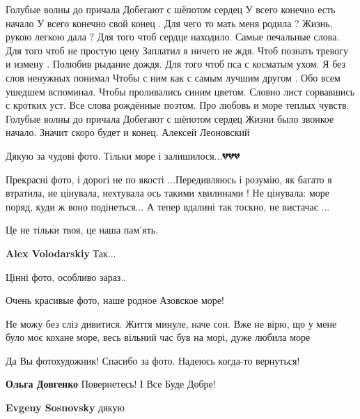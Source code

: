 \begin{multicols}{2}
\obeycr
Голубые волны до причала
Добегают с шёпотом сердец
У всего конечно есть начало
У всего конечно свой конец .
Для чего то мать меня родила ?
Жизнь, рукою легкою дала ?
Для того чтоб сердце находило.
Самые печальные слова.
Для того чтоб не простую цену
Заплатил я ничего не ждя.
Чтоб познать тревогу и измену .
Полюбив рыдание дождя.
Для того чтоб пса с косматым ухом.
Я без слов ненужных понимал
Чтобы с ним как с самым лучшим другом .
Обо всем ушедшем вспоминал.
Чтобы проливались синим цветом.
Словно лист сорвавшись с кротких уст.
Все слова рождённые поэтом.
Про любовь и море теплых чувств.
Голубые волны до причала
Добегают с шёпотом сердец
Жизни было звонкое начало.
Значит скоро будет и конец.
Алексей Леоновский
\restorecr


Дякую за чудові фото. Тільки море і залишилося...💔💔💔


Прекрасні фото, і дорогі не по якості ...Передивляюсь і розумію, як багато я
втратила, не цінувала, нехтувала ось такими хвилинами ! Не цінувала: море
поряд, куди ж воно подінеться... А тепер вдалині так тоскно, не вистачає ...


Це не тільки твоя, це наша пам'ять.

\begin{itemize} %
\textbf{Alex Volodarskiy} Так...
\end{itemize} %


Цінні фото, особливо зараз..


Очень красивые фото, наше родное Азовское море!


Не можу без сліз дивитися. Життя минуле, наче сон. Вже не вірю, що у мене було
моє кохане море, весь вільний час був на морі, дуже любила море


Да Вы фотохудожник! Спасибо за фото. Надеюсь когда-то вернуться!

\begin{itemize} %
\textbf{Ольга Довгенко} Повернетесь! І Все Буде Добре!

\textbf{Evgeny Sosnovsky} дякую
\end{itemize} %


\end{multicols}
